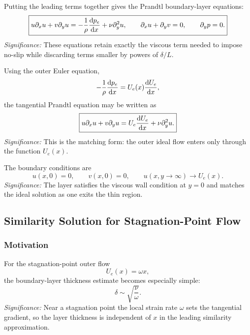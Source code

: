 \documentclass[../main.tex]{subfiles}
\begin{document}
Putting the leading terms together gives the Prandtl boundary-layer equations:
\begin{equation}
  \boxed{
  u\partial_xu+v\partial_yu
  =-\frac1\rho\dv{p_e}{x}+\nu\partial_y^2u,\qquad
  \partial_xu+\partial_yv=0,\qquad
  \partial_y p=0.}
  \label{eq:lec24_prandtl_equations}
\end{equation}
\textit{Significance:} These equations retain exactly the viscous term needed
to impose no-slip while discarding terms smaller by powers of $\delta/L$.

Using the outer Euler equation,
\begin{equation}
  -\frac1\rho\dv{p_e}{x}=U_e(x)\dv{U_e}{x},
  \label{eq:lec24_outer_euler_pressure}
\end{equation}
the tangential Prandtl equation may be written as
\begin{equation}
  \boxed{
  u\partial_xu+v\partial_yu
  =U_e\dv{U_e}{x}+\nu\partial_y^2u.}
  \label{eq:lec24_prandtl_with_outer_velocity}
\end{equation}
\textit{Significance:} This is the matching form: the outer ideal flow enters
only through the function $U_e(x)$.

The boundary conditions are
\begin{equation}
  \boxed{
  u(x,0)=0,\qquad v(x,0)=0,\qquad
  u(x,y\to\infty)\to U_e(x).}
  \label{eq:lec24_boundary_layer_bcs}
\end{equation}
\textit{Significance:} The layer satisfies the viscous wall condition at
$y=0$ and matches the ideal solution as one exits the thin region.

\subsection{Similarity Solution for Stagnation-Point Flow}\label{sec:lec24:similarity}

\subsubsection*{Motivation}
For the stagnation-point outer flow
\[
  U_e(x)=\omega x,
\]
the boundary-layer thickness estimate becomes especially simple:
\begin{equation}
  \boxed{\delta\sim\sqrt{\frac{\nu}{\omega}}.}
  \label{eq:lec24_stagnation_thickness}
\end{equation}
\textit{Significance:} Near a stagnation point the local strain rate $\omega$
sets the tangential gradient, so the layer thickness is independent of $x$ in
the leading similarity approximation.
\end{document}
